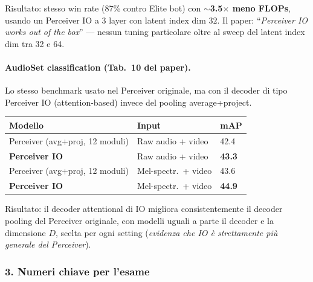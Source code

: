 \documentclass[
  11pt,
]{article}
\begin{document}
Risultato: stesso win rate (87\% contro Elite bot) con \textbf{$\sim$3.5$\times$ meno FLOPs}, usando un Perceiver IO a 3 layer con latent index dim $32$. Il paper: ``\emph{Perceiver IO works out of the box}'' --- nessun tuning particolare oltre al sweep del latent index dim tra 32 e 64.

\paragraph{AudioSet classification (Tab.\ 10 del paper).} Lo stesso benchmark usato nel Perceiver originale, ma con il decoder di tipo Perceiver IO (attention-based) invece del pooling average+project.

{\small
\begin{longtable}{@{}p{4.5cm} p{3cm} p{2cm}@{}}
\toprule
\textbf{Modello} & \textbf{Input} & \textbf{mAP} \\
\midrule
\endhead
Perceiver (avg+proj, 12 moduli) & Raw audio + video & 42.4 \\[2pt]
\textbf{Perceiver IO} & Raw audio + video & \textbf{43.3} \\[2pt]
Perceiver (avg+proj, 12 moduli) & Mel-spectr.\ + video & 43.6 \\[2pt]
\textbf{Perceiver IO} & Mel-spectr.\ + video & \textbf{44.9} \\
\bottomrule
\end{longtable}
}

Risultato: il decoder attentional di IO migliora consistentemente il decoder pooling del Perceiver originale, con modelli uguali a parte il decoder e la dimensione $D$, scelta per ogni setting (\emph{evidenza che IO è strettamente più generale del Perceiver}).

\subsubsection*{3. Numeri chiave per l'esame}
\end{document}
